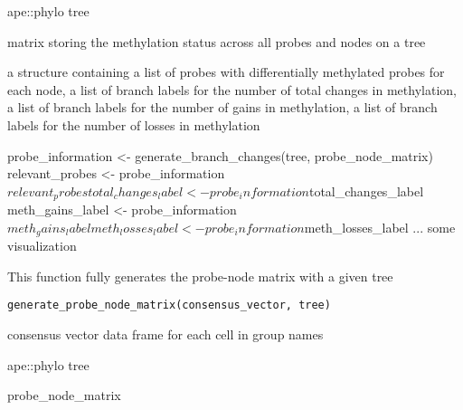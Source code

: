 \documentclass[a4paper]{book}
\begin{document}
%
\begin{Arguments}
\begin{ldescription}
\item[\code{tree}] ape::phylo tree

\item[\code{probe\_node\_matrix}] matrix storing the methylation status across all
probes and nodes on a tree
\end{ldescription}
\end{Arguments}
%
\begin{Value}
a structure containing a list of probes with differentially 
methylated probes for each node, a list of branch labels for the number of
total changes  in methylation, a list of branch labels for the number of 
gains in methylation, a list of branch labels for the number of losses in 
methylation
\end{Value}
%
\begin{Examples}
\begin{ExampleCode}
probe_information <- generate_branch_changes(tree, probe_node_matrix)
relevant_probes <- probe_information$relevant_probes
total_changes_label <- probe_information$total_changes_label
meth_gains_label <- probe_information$meth_gains_label
meth_losses_label <- probe_information$meth_losses_label
... some visualization 
\end{ExampleCode}
\end{Examples}
%
\begin{Description}\relax
This function fully generates the probe-node matrix with a given 
tree
\end{Description}
%
\begin{Usage}
\begin{verbatim}
generate_probe_node_matrix(consensus_vector, tree)
\end{verbatim}
\end{Usage}
%
\begin{Arguments}
\begin{ldescription}
\item[\code{consensus\_vector}] consensus vector data frame for each cell in group 
names

\item[\code{tree}] ape::phylo tree
\end{ldescription}
\end{Arguments}
%
\begin{Value}
probe\_node\_matrix
\end{Value}
\end{document}
